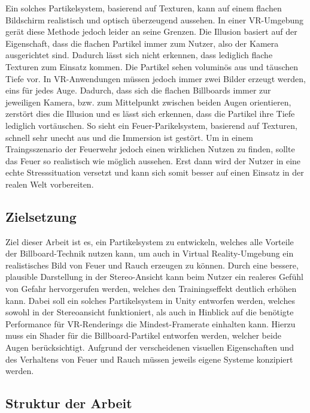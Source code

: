 Ein solches Partikelsystem, basierend auf Texturen, kann auf einem flachen Bildschirm realistisch
und optisch überzeugend aussehen. In einer VR-Umgebung gerät diese Methode jedoch leider an seine Grenzen.
Die Illusion basiert auf der Eigenschaft, dass die flachen Partikel immer zum Nutzer, also der Kamera
ausgerichtet sind. Dadurch lässt sich nicht erkennen, dass lediglich flache Texturen zum Einsatz kommen.
Die Partikel sehen voluminös aus und täuschen Tiefe vor.
In VR-Anwendungen müssen jedoch immer zwei Bilder erzeugt werden, eins für jedes Auge.
Dadurch, dass sich die flachen Billboards immer zur jeweiligen Kamera, bzw. zum Mittelpunkt
zwischen beiden Augen orientieren, zerstört dies die Illusion und es lässt sich erkennen, dass
die Partikel ihre Tiefe lediglich vortäuschen. So sieht ein Feuer-Parikelsystem, basierend auf Texturen,
schnell sehr unecht aus und die Immersion ist gestört.
Um in einem Traingsszenario der Feuerwehr jedoch einen wirklichen Nutzen zu finden, sollte das Feuer
so realistisch wie möglich aussehen. Erst dann wird der Nutzer in eine echte Stresssituation versetzt
und kann sich somit besser auf einen Einsatz in der realen Welt vorbereiten.

\subsection{Zielsetzung}

Ziel dieser Arbeit ist es, ein Partikelsystem zu entwickeln, welches alle Vorteile der Billboard-Technik
nutzen kann, um auch in Virtual Reality-Umgebung ein realistisches Bild von Feuer und Rauch erzeugen
zu können. Durch eine bessere, plausible Darstellung in der Stereo-Ansicht kann beim Nutzer ein realeres
Gefühl von Gefahr hervorgerufen werden, welches den Trainingseffekt deutlich erhöhen kann. Dabei soll
ein solches Partikelsystem in Unity entworfen werden, welches sowohl in der Stereoansicht funktioniert,
als auch in Hinblick auf die benötigte Performance für VR-Renderings die Mindest-Framerate einhalten kann.
Hierzu muss ein Shader für die Billboard-Partikel entworfen werden, welcher beide Augen berücksichtigt.
Aufgrund der verscheidenen visuellen Eigenschaften und des Verhaltens von Feuer und Rauch müssen jeweils 
eigene Systeme konzipiert werden.



\subsection{Struktur der Arbeit}


\newpage
